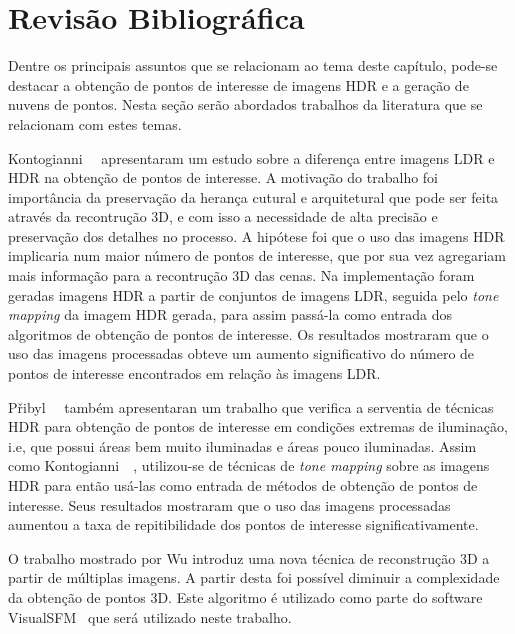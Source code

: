 \section{Revisão Bibliográfica} \label{revisaoPontos}

Dentre os principais assuntos que se relacionam ao tema deste capítulo, pode-se destacar a obtenção de pontos de interesse de imagens HDR e a geração de nuvens de pontos. Nesta seção serão abordados trabalhos da literatura que se relacionam com estes temas.

Kontogianni~\etal~\cite{hdr3d} apresentaram um estudo sobre a diferença entre imagens LDR e HDR na obtenção de pontos de interesse. A motivação do trabalho foi importância da preservação da herança cutural e arquitetural que pode ser feita através da recontrução 3D, e com isso a necessidade de alta precisão e preservação dos detalhes no processo. A hipótese foi que o uso das imagens HDR implicaria num maior número de pontos de interesse, que por sua vez agregariam mais informação para a recontrução 3D das cenas. Na implementação foram geradas imagens HDR a partir de conjuntos de imagens LDR, seguida pelo \textit{tone mapping} da imagem HDR gerada, para assim passá-la como entrada dos algoritmos de obtenção de pontos de interesse. Os resultados mostraram que o uso das imagens processadas obteve um aumento significativo do número de pontos de interesse encontrados em relação às imagens LDR.

P\v{r}ibyl~\etal~\cite{hdr3d2} também apresentaran um trabalho que verifica a serventia de técnicas HDR para obtenção de pontos de interesse em condições extremas de iluminação, i.e, que possui áreas bem muito iluminadas e áreas pouco iluminadas. Assim como Kontogianni~\etal~\cite{hdr3d}, utilizou-se de técnicas de \textit{tone mapping} sobre as imagens HDR para então usá-las como entrada de métodos de obtenção de pontos de interesse. Seus resultados mostraram que o uso das imagens processadas aumentou a taxa de repitibilidade dos pontos de interesse significativamente.

%
O trabalho mostrado por Wu \cite{visualSFMBA} introduz uma nova técnica de reconstrução 3D a partir de múltiplas imagens. A partir desta foi possível diminuir a complexidade da obtenção de pontos 3D. Este algoritmo é utilizado como parte do software VisualSFM~\cite{visualSFM} que será utilizado neste trabalho.

